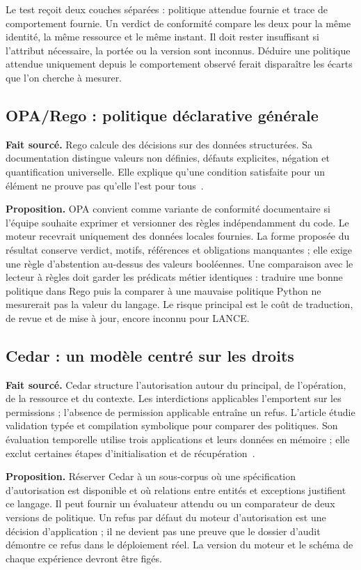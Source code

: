 \documentclass[11pt,a4paper]{article}
\begin{document}
Le test reçoit deux couches séparées : politique attendue fournie et trace de
comportement fournie. Un verdict de conformité compare les deux pour la même
identité, la même ressource et le même instant. Il doit rester insuffisant si
l'attribut nécessaire, la portée ou la version sont inconnus. Déduire une
politique attendue uniquement depuis le comportement observé ferait disparaître
les écarts que l'on cherche à mesurer.

\subsection{OPA/Rego : politique déclarative générale}
\textbf{Fait sourcé.} Rego calcule des décisions sur des données structurées.
Sa documentation distingue valeurs non définies, défauts explicites, négation
et quantification universelle. Elle explique qu'une condition satisfaite pour
un élément ne prouve pas qu'elle l'est pour tous~\cite{opa}.

\textbf{Proposition.} OPA convient comme variante de conformité documentaire
si l'équipe souhaite exprimer et versionner des règles indépendamment du code.
Le moteur recevrait uniquement des données locales fournies. La forme proposée
du résultat conserve verdict, motifs, références et obligations manquantes ;
elle exige une règle d'abstention au-dessus des valeurs booléennes.
Une comparaison avec le lecteur à règles doit garder les prédicats métier identiques : traduire
une bonne politique dans Rego puis la comparer à une mauvaise politique Python
ne mesurerait pas la valeur du langage. Le risque principal est le coût de
traduction, de revue et de mise à jour, encore inconnu pour LANCE.

\subsection{Cedar : un modèle centré sur les droits}
\textbf{Fait sourcé.} Cedar structure l'autorisation autour du principal, de
l'opération, de la ressource et du contexte. Les interdictions applicables
l'emportent sur les permissions ; l'absence de permission applicable entraîne
un refus. L'article étudie validation typée et compilation symbolique pour
comparer des politiques. Son évaluation temporelle utilise trois applications
et leurs données en mémoire ; elle exclut certaines étapes d'initialisation
et de récupération~\cite{cedar}.

\textbf{Proposition.} Réserver Cedar à un sous-corpus où une spécification
d'autorisation est disponible et où relations entre entités et exceptions
justifient ce langage. Il peut fournir un évaluateur attendu ou un comparateur
de deux versions de politique. Un refus par défaut du moteur d'autorisation
est une décision d'application ; il ne devient pas une preuve que le dossier
d'audit démontre ce refus dans le déploiement réel. La version du moteur et le
schéma de chaque expérience devront être figés.
\end{document}
